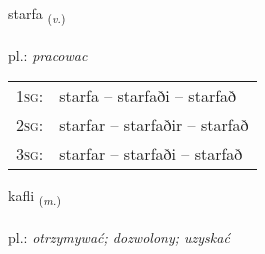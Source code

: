 \documentclass[frontgrid, backgrid]{flacards}\usepackage[]{graphicx}\usepackage[]{xcolor}
\begin{document}
\renewcommand{\blhead}{\vskip5pt {\small\bfseries\footnotesize Sagnorð | czasownik }}
\renewcommand{\bcfoot}{\vskip5pt \hspace{2pt}{\small\bfseries\footnotesize 1K}}


{starfa \small{\textsubscript{(\textit{v.})}} \\[1ex] %
\textphonetic{[starva]} \\
pl.: \emph{pracowac} \\  [2ex]
\renewcommand*{\arraystretch}{0.8}
\begin{tabular}{p{1cm}l}
\textsc{1sg}: & starfa -- starfaði -- starfað \\ 
\textsc{2sg}: & starfar -- starfaðir -- starfað \\ 
\textsc{3sg}: & starfar -- starfaði -- starfað \\ 
\end{tabular}
}

\renewcommand{\flhead}{\vskip5pt \fboxsep=0pt {\small\bfseries\footnotesize Nafnorð | rzeczownik}}
\renewcommand{\fcfoot}{\vskip5pt \fboxsep=0pt \hspace{2pt}{\small\bfseries\footnotesize 1K}}

\renewcommand{\blhead}{\vskip5pt {\small\bfseries\footnotesize Nafnorð | rzeczownik }}
\renewcommand{\bcfoot}{\vskip5pt \hspace{2pt}{\small\bfseries\footnotesize 1K}}


{kafli \small{\textsubscript{(\textit{m.})}} \\[1ex] %
\textphonetic{[kʰaplɪ]} \\
pl.: \emph{otrzymywać; dozwolony; uzyskać} \\  [2ex]
\renewcommand*{\arraystretch}{0.8}
}
\end{document}
